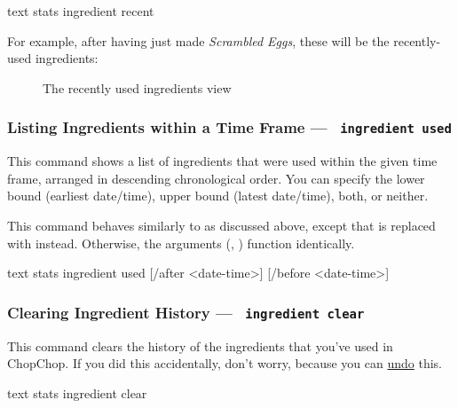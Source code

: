 	 \begin{blockofcode}{text}
		stats ingredient recent
	\end{blockofcode}

	For example, after having just made \emph{Scrambled Eggs}, these will be the recently-used ingredients:

	\begin{figure}[!htbp]\centering
		\caption{The recently used ingredients view}
	\end{figure}




\hypertarget{StatsIngredientUsedCommand}{}
\subsubsection{Listing Ingredients within a Time Frame — \texttt{ ingredient used}}

	This command shows a list of ingredients that were used within the given time frame, arranged in descending chronological order. You can specify the lower bound (earliest date/time), upper bound (latest date/time), both, or neither.

	This command behaves similarly to \hyperlink{StatsRecipeMadeCommand}{} as discussed above, except that
	 is replaced with  instead. Otherwise, the arguments (, ) function identically.

	 \begin{blockofcode}{text}
		stats ingredient used
			[/after <date-time>]
			[/before <date-time>]
	\end{blockofcode}



\hypertarget{StatsIngredientClearCommand}{}
\subsubsection{Clearing Ingredient History — \texttt{ ingredient clear}}

	This command clears the history of the ingredients that you've used in ChopChop. If you did this accidentally, don't worry, because you can \hyperlink{UndoCommand}{undo} this.

	 \begin{blockofcode}{text}
		stats ingredient clear
	\end{blockofcode}






